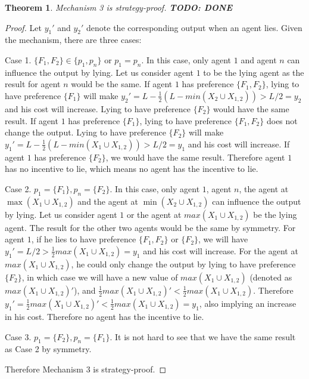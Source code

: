 \documentclass[twoside,11pt]{article}
\newtheorem{theorem}{Theorem}
\newcommand{\todo}[1]{}
\renewcommand{\todo}[1]{{\textbf{\color{red} TODO: {#1}}}}
\begin{document}
\begin{theorem}\label{t-max-max-sp}
Mechanism 3 is strategy-proof.
\todo{DONE}
\end{theorem}
\begin{proof}
Let $y_1'$ and $y_2'$ denote the corresponding output when an agent lies. Given the mechanism, there are three cases:

Case 1. $\{F_{1}, F_{2}\} \in \{p_{1}, p_{n}\}$ or $p_{1} = p_{n}$.
In this case, only agent $1$ and agent $n$ can influence the output by lying.
Let us consider agent $1$ to be the lying agent as the result for agent $n$ would be the same.
If agent $1$ has preference $\{F_1,F_2\}$, lying to have preference $\{F_1\}$ will make $y_2' = L- \frac{1}{2} (L-min (X_{2} \cup X_{1,2}))>L/2 = y_2$ and his cost will increase.
Lying to have preference $\{F_{2}\}$ would have the same result.
If agent $1$ has preference $\{F_{1}\}$, lying to have preference $\{F_1,F_2\}$ does not change the output.
Lying to have preference $\{F_2\}$ will make $y_1' = L - \frac{1}{2} (L-min (X_{1} \cup X_{1,2}))>L/2 = y_1$ and his cost will increase.
If agent $1$ has preference $\{F_2\}$, we would have the same result. Therefore agent $1$ has no incentive to lie, which means no agent has the incentive to lie.

Case 2. $p_{1} = \{F_{1}\}, p_{n}=\{F_{2}\}$.
In this case, only agent $1$, agent $n$, the agent at $\max (X_{1} \cup X_{1,2})$ and the agent at $\min (X_{2} \cup X_{1,2})$ can influence the output by lying. Let us consider agent $1$ or the agent at $max (X_{1} \cup X_{1,2})$ be the lying agent. The result for the other two agents would be the same by symmetry. For agent $1$, if he lies to have preference $\{F_1,F_2\}$ or $\{F_2\}$, we will have $y_1' = L/2 > \frac{1}{2}max (X_{1} \cup X_{1,2}) = y_1$ and his cost will increase. For the agent at $max (X_{1} \cup X_{1,2})$, he could only change the output by lying to have preference $\{F_2\}$, in which case we will have a new value of $max (X_{1} \cup X_{1,2})$ (denoted as $max (X_{1} \cup X_{1,2})'$), and $\frac{1}{2}max (X_{1} \cup X_{1,2})'<\frac{1}{2}max (X_{1} \cup X_{1,2})$. Therefore $y_1' = \frac{1}{2}max (X_{1} \cup X_{1,2})' < \frac{1}{2}max (X_{1} \cup X_{1,2}) = y_1$, also implying an increase in his cost. Therefore no agent has the incentive to lie.

Case 3. $p_{1} = \{F_{2}\}, p_{n}=\{F_{1}\}$.
It is not hard to see that we have the same result as Case 2 by symmetry.

Therefore Mechanism 3 is strategy-proof.
\end{proof}
\end{document}
